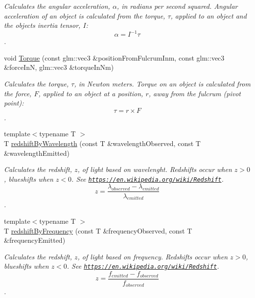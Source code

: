\begin{DoxyCompactItemize}
\begin{DoxyCompactList}\small\item\em Calculates the angular acceleration, $\alpha$, in radians per second squared. Angular acceleration of an object is calculated from the torque, $\tau$, applied to an object and the object\textquotesingle{}s inertia tensor, $I$\+: \[\alpha=I^{-1} \tau \]. \end{DoxyCompactList}\item 
void \mbox{\hyperlink{group___e_g_x_phys-_kinetics-_torque_ga12a787853cab88d40412c8290ca41c61}{Torque}} (const glm\+::vec3 \&position\+From\+Fulcrum\+Inm, const glm\+::vec3 \&force\+InN, glm\+::vec3 \&torque\+In\+Nm)
\begin{DoxyCompactList}\small\item\em Calculates the torque, $\tau$, in Newton meters. Torque on an object is calculated from the force, $F$, applied to an object at a position, $r$, away from the fulcrum (pivot point)\+: \[\tau=r \times F \]. \end{DoxyCompactList}\item 
{\footnotesize template$<$typename T $>$ }\\T \mbox{\hyperlink{group___e_g_x_phys-_optics_ga29300a13e34da35332ca2d447b5ce82d}{redshift\+By\+Wavelength}} (const T \&wavelength\+Observed, const T \&wavelength\+Emitted)
\begin{DoxyCompactList}\small\item\em Calculates the redshift, $z$, of light based on wavelenght. Redshifts occur when $z > 0$, blueshifts when $z < 0$. See \href{https://en.wikipedia.org/wiki/Redshift}{\tt https\+://en.\+wikipedia.\+org/wiki/\+Redshift}. \[z=\frac{\lambda_{observed}-\lambda_{emitted}}{\lambda_{emitted}}\]. \end{DoxyCompactList}\item 
{\footnotesize template$<$typename T $>$ }\\T \mbox{\hyperlink{group___e_g_x_phys-_optics_gacc6d3b2922061214d64b89a4b8e3967a}{redshift\+By\+Frequency}} (const T \&frequency\+Observed, const T \&frequency\+Emitted)
\begin{DoxyCompactList}\small\item\em Calculates the redshift, $z$, of light based on frequency. Redshifts occur when $z > 0$, blueshifts when $z < 0$. See \href{https://en.wikipedia.org/wiki/Redshift}{\tt https\+://en.\+wikipedia.\+org/wiki/\+Redshift}. \[z=\frac{f_{emitted}-f_{observed}}{f_{observed}}\]. \end{DoxyCompactList}\item 

\end{DoxyCompactItemize}
